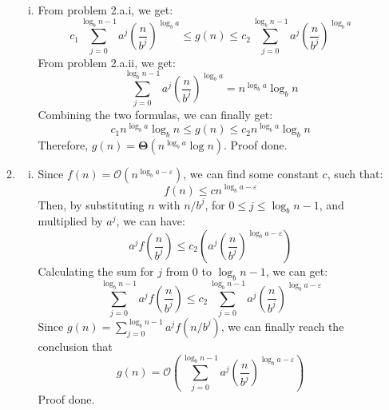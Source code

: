 \documentclass[12pt, a4paper]{article}
\begin{document}
\begin{enumerate}
\begin{enumerate}
\begin{enumerate}[i)]
            \item From problem 2.a.i, we get:
                  $$c_1 \sum_{j=0}^{\log_b n - 1} a^j (\frac{n}{b^j})^{\log_b a} \leq g(n) \leq c_2 \sum_{j=0}^{\log_b n - 1} a^j (\frac{n}{b^j})^{\log_b a}$$
                  From problem 2.a.ii, we get:
                  $$\sum_{j=0}^{\log_b n - 1} a^j (\frac{n}{b^j})^{\log_b a} = n^{\log_b a}\log_b n$$
                  Combining the two formulas, we can finally get:
                  $$c_1 n^{\log_b a}\log_b n \leq g(n) \leq c_2 n^{\log_b a}\log_b n$$
                  Therefore, $g(n) = \boldsymbol{\Theta}(n^{\log_b a}\log n)$. Proof done.
        \end{enumerate}
        
        \item \begin{enumerate}[i)]
            \item Since $f(n) = \mathcal{O}(n^{\log_b a - \varepsilon})$, we can find some constant $c$, such that:
                  $$f(n) \leq c n^{\log_b a - \varepsilon}$$
                  Then, by substituting $n$ with $n/b^j$, for $0 \leq j \leq \log_b n - 1$, and multiplied by $a^j$, we can have:
                  $$a^j f(\frac{n}{b^j}) \leq c_2(a^j (\frac{n}{b^j})^{\log_b a - \varepsilon})$$
                  Calculating the sum for $j$ from 0 to $\log_b n - 1$, we can get:
                  $$\sum_{j=0}^{\log_b n - 1} a^j f(\frac{n}{b^j}) \leq c_2 \sum_{j=0}^{\log_b n - 1} a^j (\frac{n}{b^j})^{\log_b a - \varepsilon}$$
                  Since $g(n) = \sum_{j=0}^{\log_b n - 1} a^j f(n/b^j)$, 
                  we can finally reach the conclusion that 
                  $$g(n) = \mathcal{O}(\sum_{j=0}^{\log_b n - 1} a^j (\frac{n}{b^j})^{\log_b a - \varepsilon})$$ 
                  Proof done.
                

\end{enumerate}
\end{enumerate}
\end{enumerate}
\end{document}
